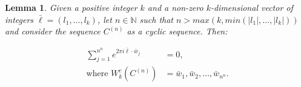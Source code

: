\documentclass[11pt,a4paper]{tesis}
\theoremstyle{plain}
\newtheorem{lemma}[theorem]{Lemma}
\theoremstyle{definition}
\begin{document}
\begin{lemma}\label{lemma:weyl-sum-over-cyclic-c-sequences}
  Given a positive integer $k$ and a non-zero $k$-dimensional vector of integers $\bar{\ell} = (l_1, \dots, l_k)$, let $n \in \mathbb{N}$ such that $n > max\left(k, min\left(|l_1|, \dots, |l_k|\right)\right)$ and consider the sequence $C^{(n)}$ as a cyclic sequence. Then:

  \begin{equation}\label{equation:weyl-sum-over-cyclic-c-sequence}
    \begin{aligned}
      \sum_{j = 1}^{n^n} e^{2 \pi i \bar{\ell} \cdot \bar{w}_j} & = 0 \text{,} \\
      \text{where } W_k^c\left(C^{(n)}\right) & = \bar{w}_1, \bar{w}_2, \dots, \bar{w}_{n^n} \text{.}
    \end{aligned}
  \end{equation}

\end{lemma}
\end{document}
